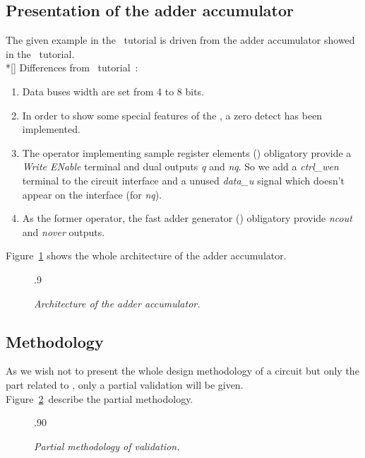   \subsection{Presentation of the adder accumulator}
   \forceindent
     The given example in the \datapath\ tutorial is driven from the adder
   accumulator showed in the \addaccu\ tutorial.\\*[\bigskipamount]
   \forceindent
     Differences from \addaccu\ tutorial~:
   \begin{enumerate}
     \samepage
     \item
       Data buses width are set from 4 to 8 bits.
     \item
       In order to show some special features of the \datapathcomp, a zero
       detect has been implemented.
     \item
       The operator implementing sample register elements (\DPPDFF)
       obligatory provide a {\it Write ENable} terminal and dual outputs
       {\it q} and {\it nq}. So we add a {\it ctrl\_wen} terminal to the
       circuit interface and a unused {\it data\_u} signal which doesn't
       appear on the interface (for {\it nq}).
     \item
       As the former operator, the fast adder generator (\DPADDIIF)
       obligatory provide {\it ncout} and {\it nover} outputs.
   \end{enumerate}
   \nopagebreak
     Figure~\ref{schemasample} shows the whole architecture of the adder
   accumulator.
   \begin{figure}[H]
     \vspace*{0.5cm}
     \begin{center}
       \leavevmode\epsfxsize.9\textwidth{}
     \end{center}
     \nopagebreak
     \caption{
       \label{schemasample}
       {\it Architecture of the adder accumulator.}}
   \end{figure}
   \subsection{Methodology}
   \forceindent
     As we wish not to present the whole design methodology of a circuit but
   only the part related to \datapath, only a partial validation will be
   given.\\
   \nopagebreak
   \indent
     Figure~\ref{methosample}\ describe the partial methodology.\\
   \begin{figure}[hbtp]
     \begin{center}
       \leavevmode\epsfysize.90\textheight{}
     \end{center}
     \nopagebreak
     \caption{
       \label{methosample}
       {\it Partial methodology of validation.}}
   \end{figure}
